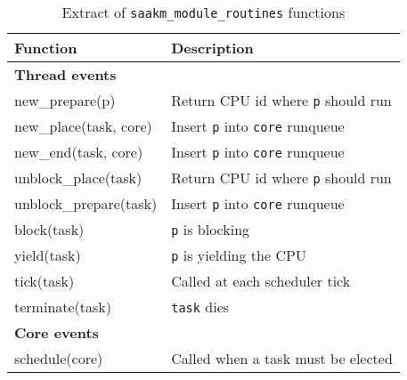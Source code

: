 \begin{table}[htbp!]
        \caption{Extract of \texttt{saakm\_module\_routines} functions}
        \begin{tabular}{|l|l|}
        \hline
        \textbf{Function} & \textbf{Description} \\
        \hline
                \textbf{Thread events} &\\
                new\_prepare(p) & Return CPU id where \texttt{p} should run\\
                new\_place(task, core) & Insert \texttt{p} into \texttt{core} runqueue\\
                new\_end(task, core) & Insert \texttt{p} into \texttt{core} runqueue\\
                unblock\_place(task) & Return CPU id where \texttt{p} should run\\
                unblock\_prepare(task) & Insert \texttt{p} into \texttt{core} runqueue\\
                block(task) & \texttt{p} is blocking\\
                yield(task) & \texttt{p} is yielding the CPU\\
                tick(task) & Called at each scheduler tick \\
                terminate(task) & \texttt{task} dies \\
                \hline
                \textbf{Core events} & \\
                \hline
                schedule(core) & Called when a task must be elected\\

\end{tabular}
\end{table}
